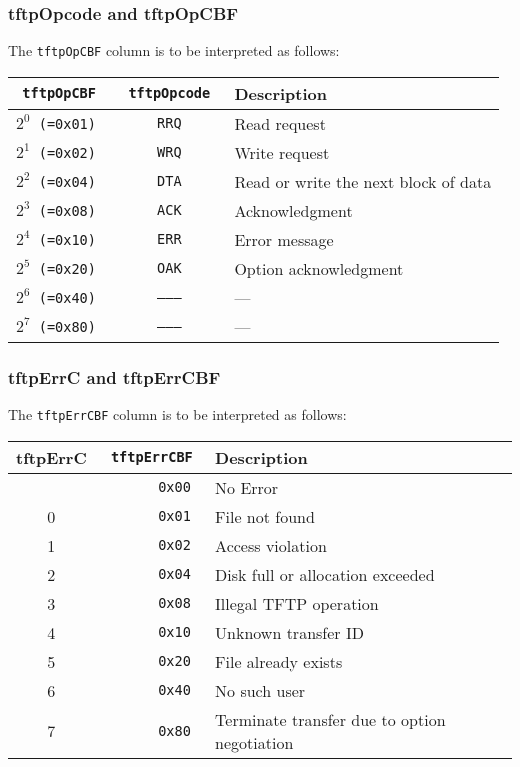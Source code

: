 \documentclass[documentation]{subfiles}
\begin{document}
\subsubsection{tftpOpcode and tftpOpCBF}\label{tftpOpCBF}
The {\tt tftpOpCBF} column is to be interpreted as follows:
\begin{longtable}{>{\tt}r>{\tt}cl}
    \toprule
    {\bf tftpOpCBF} & {\bf tftpOpcode} & {\bf Description} \\
    \midrule\endhead%
    $2^0$ (=0x01)   & RRQ              & Read request \\
    $2^1$ (=0x02)   & WRQ              & Write request \\
    $2^2$ (=0x04)   & DTA              & Read or write the next block of data \\
    $2^3$ (=0x08)   & ACK              & Acknowledgment \\
    $2^4$ (=0x10)   & ERR              & Error message \\
    $2^5$ (=0x20)   & OAK              & Option acknowledgment \\
    $2^6$ (=0x40)   & --{}--{}--       & --- \\
    $2^7$ (=0x80)   & --{}--{}--       & --- \\
    \bottomrule
\end{longtable}

\subsubsection{tftpErrC and tftpErrCBF}\label{tftpErrCBF}
The {\tt tftpErrCBF} column is to be interpreted as follows:
\begin{longtable}{c>{\tt}rl}
    \toprule
    {\bf tftpErrC} & {\bf tftpErrCBF} & {\bf Description} \\
    \midrule\endhead%
       & 0x00 & No Error \\
     0 & 0x01 & File not found \\
     1 & 0x02 & Access violation \\
     2 & 0x04 & Disk full or allocation exceeded \\
     3 & 0x08 & Illegal TFTP operation \\
     4 & 0x10 & Unknown transfer ID \\
     5 & 0x20 & File already exists \\
     6 & 0x40 & No such user \\
     7 & 0x80 & Terminate transfer due to option negotiation \\
    \bottomrule
\end{longtable}
\end{document}
